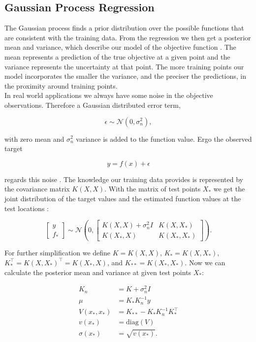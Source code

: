 \subsection{Gaussian Process Regression}
The Gaussian process finds a prior distribution over the possible functions that are consistent with the training data. From the regression we then get a posterior mean and variance, which describe our model of the objective function \cite{rasmussen2006gaussian}. The mean represents a prediction of the true objective at a given point and the variance represents the uncertainty at that point. The more training points our model incorporates the smaller the variance, and the preciser the predictions, in the proximity around training points.\\
In real world applications we always have some noise in the objective observations. Therefore a Gaussian distributed error term,

$$\epsilon \sim \mathcal{N}(0,\sigma_n^2),$$

with zero mean and $\sigma_n^2$ variance is added to the function value. Ergo the observed target

$$y = f(x) + \epsilon$$

regards this noise \cite{brochu2010tutorial,rasmussen2006gaussian,lizotte2008practical,shahriari2016taking}. The knowledge our training data provides is represented by the covariance matrix $K(X,X)$. With the matrix of test points $X_*$ we get the joint distribution of the target values and the estimated function values at the test locations \cite{rasmussen2006gaussian}:

$$\left[ \begin{array}{c} y \\ f_* \end{array} \right] \sim \mathcal{N} \left(0, \begin{bmatrix} K(X,X)+\sigma_n^2 I & K(X,X_*) \\ K(X_*,X) & K(X_*,X_*) \end{bmatrix} \right).$$

For further simplification we define $K = K(X,X)$, $K_* = K(X,X_*)$, $K_*^{\top} = K(X,X_*)^{\top} = K(X_*,X)$, and $K_{**} = K(X_*,X_*)$. Now we can calculate the posterior mean and variance at given test points $X_*$:

\begin{align}
    K_n &= K+\sigma_n^2 I \label{eq:kNoise} \\
    \mu &= K_*K_n^{-1}y \label{eq:meanGauss} \\
    V(x_*,x_*) &= K_{**}-K_*K_n^{-1}K_*^\top \label{eq:wholeVar} \\
    v(x_*) &= \mathrm{diag}(V) \label{eq:vectorVar} \\
    \sigma(x_*) &= \sqrt{v(x_*)}. \label{eq:gp:stdv}\\ \nonumber
\end{align}

